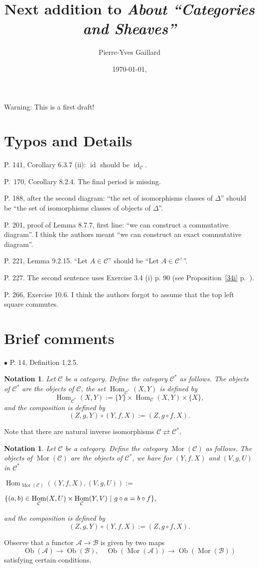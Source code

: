 \documentclass[12pt]{article}
\title{Next addition to \em{About ``Categories and Sheaves''}}
\author{Pierre-Yves Gaillard}
\date{\today, \currenttime}
\newtheorem{nota}[thm]{Notation}
\theoremstyle{remark}
\newcommand{\bu}{\bullet}
\newcommand{\n}{\noindent}
\newcommand{\A}{\mathcal A}
\newcommand{\B}{\mathcal B}
\newcommand{\C}{\mathcal C}
\DeclareMathOperator{\id}{id}
\DeclareMathOperator{\h}{Hom}
\DeclareMathOperator{\Mor}{Mor}
\DeclareMathOperator{\Ob}{Ob}
\begin{document}
 
% 
\maketitle 

\n Warning: This is a first draft!
%
\section{Typos and Details} 
%
\n P. 141, Corollary 6.3.7 (ii): $\id$ should be $\id_\C$. 

\n P.~170, Corollary 8.2.4. The final period is missing. 

\n P. 188, after the second diagram: ``the set of isomorphisms classes of $\Delta$'' should be ``the set of isomorphisms classes of objects of $\Delta$''. 


\n P. 201, proof of Lemma 8.7.7, first line: ``we can construct a commutative diagram''. I think the authors meant ``we can construct an exact commutative diagram''. 

\n P. 221, Lemma 9.2.15. ``Let $A\in\C$'' should be ``Let $A\in\C^\wedge$''. 

\n P. 227. The second sentence uses Exercise 3.4 (i) p. 90 (see Proposition~\ref{34i} p.~\pageref{34i}). 

\n P. 266, Exercise 10.6. I think the authors forgot to assume that the top left square commutes. 
% 
\section{Brief comments} %
%
\n$\bu$ P. 14, Definition 1.2.5.
%
\begin{nota}\label{c*}%
%
Let $\C$ be a category. Define the category $\C^*$ as follows. The objects of $\C^*$ are the objects of $\C$, the set $\h_{\C^*}(X,Y)$ is defined by  
$$
\h_{\C^*}(X,Y):=\{Y\}\times\h_{\C}(X,Y)\times\{X\},
$$
and the composition is defined by 
$$
(Z,g,Y)\circ(Y,f,X):=(Z,g\circ f,X).
$$ 
%
\end{nota}
%
Note that there are natural inverse isomorphisms $\C\rightleftarrows\C^*$. 
%
\begin{nota}\label{mor}
%
Let $\C$ be a category. Define the category $\Mor(\C)$ as follows. The objects of $\Mor(\C)$ are the objects of $\C^*$, we have for $(Y,f,X)$ and $(V,g,U)$ in $\C^*$\bigskip 

\n$\displaystyle \h_{\Mor(\C)}((Y,f,X),(V,g,U)):=$\bigskip 

$\hfill\displaystyle\{(a,b)\in\h_\C(X,U)\times\h_\C(Y,V)\ | \ g\circ a=b\circ f\},$\bigskip 

\n and the composition is defined by 
$$
(Z,g,Y)\circ(Y,f,X):=(Z,g\circ f,X).
$$
%
\end{nota}
%
Observe that a functor $\A\to\B$ is given by two maps 
$$
\Ob(\A)\to\Ob(\B),\quad\Ob(\Mor(\A))\to\Ob(\Mor(\B))
$$ 
satisfying certain conditions. 
\end{document}

